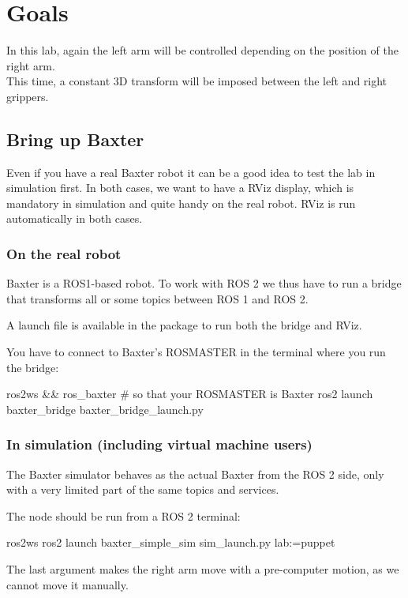 \documentclass{ecnreport}
\author{O. Kermorgant}
\begin{document}


\section{Goals}

In this lab, again the left arm will be controlled depending on the position of the right arm.\\
This time, a constant 3D transform will be imposed between the left and right grippers. 

\subsection{Bring up Baxter}

Even if you have a real Baxter robot it can be a good idea to test the lab in simulation first.
In both cases, we want to have a RViz display, which is mandatory in simulation and quite handy on the real robot. RViz is run automatically in both cases.

\subsubsection{On the real robot}

Baxter is a ROS1-based robot. To work with ROS 2 we thus have to run a bridge that transforms all or some topics between ROS 1 and ROS 2.

A launch file is available in the  package to run both the bridge and RViz.

You have to connect to Baxter's ROSMASTER in the terminal where you run the bridge:
\begin{bashcodelarge}
 ros2ws && ros_baxter # so that your ROSMASTER is Baxter
 ros2 launch baxter_bridge baxter_bridge_launch.py
\end{bashcodelarge}

\subsubsection{In simulation (including virtual machine users)}

The Baxter simulator behaves as the actual Baxter from the ROS 2 side, only with a very limited part of the same topics and services. 

The  node should be run from a ROS 2 terminal:
\begin{bashcodelarge}
ros2ws
ros2 launch baxter_simple_sim sim_launch.py lab:=puppet
\end{bashcodelarge}
The last argument makes the right arm move with a pre-computer motion, as we cannot move it manually.
\end{document}
